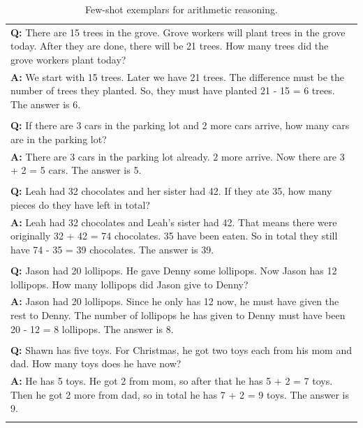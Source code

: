 \begin{table}[h]
    \caption{Few-shot exemplars for arithmetic reasoning.}
    \label{tab:mathprompt}
    \centering
    \begin{tabularx}{\columnwidth}{@{}X@{}}
        \toprule
        \textbf{Q:} There are 15 trees in the grove. Grove workers will plant trees in the grove today. After they are done, there will be 21 trees. How many trees did the grove workers plant today? \\
        \textbf{A:} We start with 15 trees. Later we have 21 trees. The difference must be the number of trees they planted. So, they must have planted 21 - 15 = 6 trees. The answer is 6. \\ \\
        \textbf{Q:} If there are 3 cars in the parking lot and 2 more cars arrive, how many cars are in the parking lot? \\
        \textbf{A:} There are 3 cars in the parking lot already. 2 more arrive. Now there are 3 + 2 = 5 cars. The answer is 5. \\\\
        \textbf{Q:} Leah had 32 chocolates and her sister had 42. If they ate 35, how many pieces do they have left in total? \\
        \textbf{A:} Leah had 32 chocolates and Leah’s sister had 42. That means there were originally 32 + 42 = 74 chocolates. 35 have been eaten. So in total they still have 74 - 35 = 39 chocolates. The answer is 39. \\\\
        \textbf{Q:} Jason had 20 lollipops. He gave Denny some lollipops. Now Jason has 12 lollipops. How many lollipops did Jason give to Denny? \\
        \textbf{A:} Jason had 20 lollipops. Since he only has 12 now, he must have given the rest to Denny. The number of lollipops he has given to Denny must have been 20 - 12 = 8 lollipops. The answer is 8. \\\\
        \textbf{Q:} Shawn has five toys. For Christmas, he got two toys each from his mom and dad. How many toys does he have now? \\
        \textbf{A:} He has 5 toys. He got 2 from mom, so after that he has 5 + 2 = 7 toys. Then he got 2 more from dad, so in total he has 7 + 2 = 9 toys. The answer is 9. \\\\

\end{tabularx}
\end{table}

